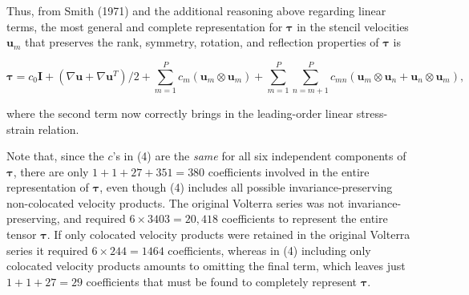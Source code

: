 Thus, from Smith (1971) and the additional reasoning above regarding linear terms, the most general and complete representation for $\mathbf{\tau}$  in the stencil velocities $\mathbf{u}_{m}$ that preserves the rank, symmetry, rotation, and reflection properties of $\mathbf{\tau}$ is 

%
\begin{equation}
	\label{E:17}
	\mathbf{\tau} = c_0 \mathbf{I} 
	+ (\nabla \mathbf{u} + \nabla \mathbf{u}^T)/2 
	+ \sum_{m=1}^{P} c_m (\mathbf{u}_m \otimes \mathbf{u}_m)
	+ \sum_{m=1}^{P} \sum_{n=m+1}^{P} c_{mn} (\mathbf{u}_m \otimes \mathbf{u}_n +
	\mathbf{u}_n \otimes \mathbf{u}_m), 
\end{equation}
%
%      

where the second term now correctly brings in the leading-order linear stress-strain relation.

Note that, since the $c$'s in (4) are the \textit{same} for all six independent components of $\mathbf{\tau}$, there are only $1 + 1 + 27 + 351 = 380$ coefficients involved in the entire representation of $\mathbf{\tau}$, even though (4) includes all possible invariance-preserving non-colocated velocity products. The original Volterra series was not invariance-preserving, and required  $6 \times 3403 = 20,418$ coefficients to represent the entire tensor $\mathbf{\tau}$. If only colocated velocity products were retained in the original Volterra series it required $6 \times 244 = 1464$  coefficients, whereas in (4) including only colocated velocity products amounts to omitting the final term, which leaves just $1 + 1 + 27 = 29$ coefficients that must be found to completely represent $\mathbf{\tau}$.


